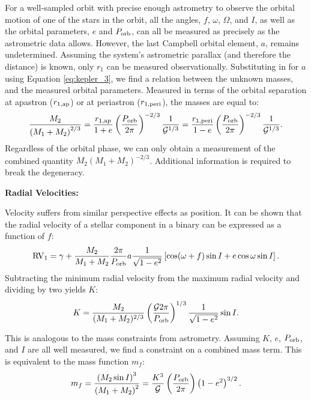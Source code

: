 \documentclass[12pt,preprint]{hackaastex}
\newcommand{\Porb}{\ifmmode {P_{\rm orb}}\else${P_{\rm orb}}$\fi}
\newcommand{\RV}{\ifmmode {{\rm RV}}\else RV \fi}
\newcommand{\bigG}{\ifmmode {\mathcal{G}}\else${\mathcal{G}}$\fi}
\begin{document}
For a well-sampled orbit with precise enough astrometry to observe the orbital motion of one of the stars in the orbit, all the angles, $f$, $\omega$, $\Omega$, and $I$, as well as the orbital parameters, $e$  and $P_{\rm orb}$, can all be measured as precisely as the astrometric data allows. However, the last Campbell orbital element, $a$, remains undetermined. Assuming the system's astrometric parallax (and therefore the distance) is known, only $r_1$ can be measured observationally. Substituting in for $a$ using Equation \ref{eq:kepler_3}, we find a relation between the unknown masses, and the measured orbital parameters. Measured in terms of the orbital separation at apastron ($r_{\rm 1, ap}$) or at periastron ($r_{\rm 1, peri}$), the masses are equal to:
\begin{equation}
\frac{M_2}{\left( M_1 + M_2 \right)^{2/3}} = \frac{r_{\rm 1, ap}}{1 + e} \left( \frac{P_{\rm orb}}{2 \pi} \right)^{-2/3} \frac{1}{\mathcal{G}^{1/3}} = \frac{r_{\rm 1, peri}}{1 - e} \left( \frac{P_{\rm orb}}{2 \pi} \right)^{-2/3} \frac{1}{\mathcal{G}^{1/3}}.
\end{equation}
Regardless of the orbital phase, we can only obtain a measurement of the combined quantity $M_2 \left( M_1 + M_2 \right)^{-2/3}$. Additional information is required to break the degeneracy.





{\large \textbf{ Radial Velocities:}}

Velocity suffers from similar perspective effects as position. It can be shown that the radial velocity of a stellar component in a binary can be expressed as a function of $f$:
\begin{equation}
\RV_1 = \gamma + \frac{M_2}{M_1 + M_2} \frac{2\pi}{\Porb} a \frac{1}{\sqrt{1-e^2}} \left[ \cos(\omega + f) \sin I + e \cos \omega \sin I \right]. 
\end{equation}
Subtracting the minimum radial velocity from the maximum radial velocity and dividing by two yields $K$:
\begin{equation}
K = \frac{M_2}{(M_1 + M_2)^{2/3}} \left( \frac{\bigG 2 \pi}{\Porb}\right)^{1/3} \frac{1}{\sqrt{1-e^2}} \sin I.
\end{equation}

This is analogous to the mass constraints from astrometry. Assuming $K$, $e$, $P_{\rm orb}$, and $I$ are all well measured, we find a constraint on a combined mass term. This is equivalent to the mass function $m_f$:
\begin{equation}
m_f = \frac{\left( M_2 \sin I \right)^3}{\left( M_1 + M_2 \right)^2} = \frac{K^3}{\bigG} \left( \frac{P_{\rm orb}}{2 \pi} \right) \left(1-e^2 \right)^{3/2}.
\end{equation}
\end{document}
